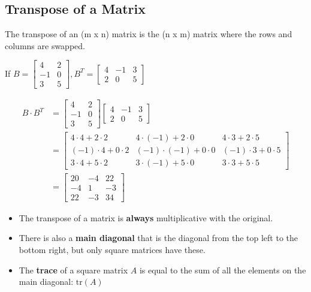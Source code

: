 \documentclass[
  letterpaper,
  DIV=11,
  numbers=noendperiod]{scrartcl}
\providecommand{\tightlist}{%
  \setlength{\itemsep}{0pt}\setlength{\parskip}{0pt}}\usepackage{longtable,booktabs,array}
\begin{document}
\subsection{Transpose of a Matrix}\label{transpose-of-a-matrix}

The transpose of an (m x n) matrix is the (n x m) matrix where the rows
and columns are swapped.

If
\(B = \begin{bmatrix} 4 & 2 \\ -1 & 0 \\ 3 & 5 \end{bmatrix}, B^T = \begin{bmatrix} 4 & -1 & 3 \\ 2 & 0 & 5 \end{bmatrix}\)

\begin{align*}
B \cdot B^T &= \begin{bmatrix} 4 & 2 \\ -1 & 0 \\ 3 & 5 \end{bmatrix} \begin{bmatrix} 4 & -1 & 3 \\ 2 & 0 & 5 \end{bmatrix} \\ 
&= \begin{bmatrix} 4 \cdot 4 + 2 \cdot 2 & 4 \cdot (-1) + 2 \cdot 0 & 4 \cdot 3 + 2 \cdot 5 \\ (-1) \cdot 4 + 0 \cdot 2 & (-1) \cdot (-1) + 0 \cdot 0 & (-1) \cdot 3 + 0 \cdot 5 \\ 3 \cdot 4 + 5 \cdot 2 & 3 \cdot (-1) + 5 \cdot 0 & 3 \cdot 3 + 5 \cdot 5 \end{bmatrix} \\ 
&= \begin{bmatrix} 20 & -4 & 22 \\ -4 & 1 & -3 \\ 22 & -3 & 34\end{bmatrix}
\end{align*}

\begin{itemize}
\tightlist
\item
  The transpose of a matrix is \textbf{always} multiplicative with the
  original.
\item
  There is also a \textbf{main diagonal} that is the diagonal from the
  top left to the bottom right, but only square matrices have these.
\item
  The \textbf{trace} of a square matrix \(A\) is equal to the sum of all
  the elements on the main diagonal: \(\mathrm{tr}(A)\)
\end{itemize}
\end{document}
